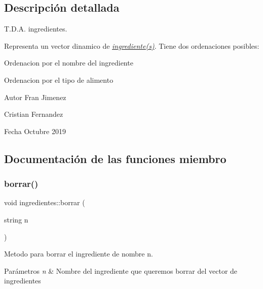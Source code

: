 \subsection{Descripción detallada}
T.\+D.\+A. ingredientes. 

Representa un vector dinamico de {\itshape \hyperlink{classingrediente}{ingrediente(s)}}. Tiene dos ordenaciones posibles\+:


\begin{DoxyItemize}
\item Ordenacion por el nombre del ingrediente
\item Ordenacion por el tipo de alimento
\end{DoxyItemize}

\begin{DoxyAuthor}{Autor}
Fran Jimenez 

Cristian Fernandez 
\end{DoxyAuthor}
\begin{DoxyDate}{Fecha}
Octubre 2019 
\end{DoxyDate}


\subsection{Documentación de las funciones miembro}
\mbox{\label{classingredientes_a71bde8efdf96c22f0f27ab9cc6e50466}} 
\subsubsection{\texorpdfstring{borrar()}{borrar()}}
{\footnotesize\ttfamily void ingredientes\+::borrar (\begin{DoxyParamCaption}\item[{string}]{n }\end{DoxyParamCaption})}



Metodo para borrar el ingrediente de nombre n. 


\begin{DoxyParams}{Parámetros}
{\em n} & Nombre del ingrediente que queremos borrar del vector de ingredientes \\
\hline
\end{DoxyParams}
\mbox{\label{classingredientes_a2d4257359160b39365b1aac2ec6a1166}} 
